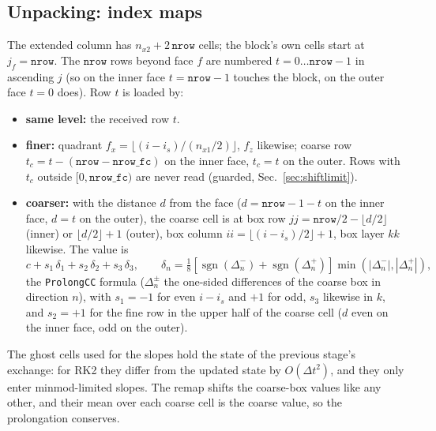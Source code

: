 \documentclass[11pt]{article}
\newcommand{\code}[1]{\texttt{#1}}
\newcommand{\fn}[1]{\texttt{\small #1}}
\begin{document}
\subsection{Unpacking: index maps}
The extended column has $n_{x2} + 2\,\code{nrow}$ cells; the block's own cells start at
$j_f = \code{nrow}$. The $\code{nrow}$ rows beyond face $f$ are numbered
$t = 0 \ldots \code{nrow}-1$ in ascending $j$ (so on the inner face $t = \code{nrow}-1$
touches the block, on the outer face $t = 0$ does). Row $t$ is loaded by:
\begin{itemize}\itemsep2pt
\item \textbf{same level:} the received row $t$.
\item \textbf{finer:} quadrant $f_x = \lfloor (i-i_s)/(n_{x1}/2)\rfloor$, $f_z$ likewise;
      coarse row $t_c = t - (\code{nrow}-\code{nrow\_fc})$ on the inner face, $t_c = t$ on
      the outer. Rows with $t_c$ outside $[0, \code{nrow\_fc})$ are never read (guarded,
      Sec.~\ref{sec:shiftlimit}).
\item \textbf{coarser:} with the distance $d$ from the face ($d = \code{nrow}-1-t$ on the
      inner face, $d = t$ on the outer), the coarse cell is at box row
      $jj = \code{nrow}/2 - \lfloor d/2\rfloor$ (inner) or $\lfloor d/2\rfloor + 1$ (outer),
      box column $ii = \lfloor (i-i_s)/2\rfloor + 1$, box layer $kk$ likewise. The value is
      \begin{equation}
        c + s_1\,\delta_1 + s_2\,\delta_2 + s_3\,\delta_3, \qquad
        \delta_n = \tfrac18\left[\operatorname{sgn}(\Delta^-_n) +
        \operatorname{sgn}(\Delta^+_n)\right]\min(|\Delta^-_n|, |\Delta^+_n|),
      \end{equation}
      the \fn{ProlongCC} formula ($\Delta^\pm_n$ the one-sided differences of the coarse
      box in direction $n$), with $s_1 = -1$ for even $i - i_s$ and $+1$ for odd, $s_3$
      likewise in $k$, and $s_2 = +1$ for the fine row in the upper half of the coarse cell
      ($d$ even on the inner face, odd on the outer).
\end{itemize}

\noindent
The ghost cells used for the slopes hold the state of the previous stage's exchange:
for RK2 they differ from the updated state by $O(\Delta t^2)$, and they only enter
minmod-limited slopes. The remap shifts the coarse-box values like any other, and their
mean over each coarse cell is the coarse value, so the prolongation conserves.

\end{document}
